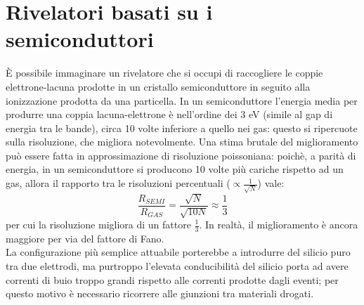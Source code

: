 \section{Rivelatori basati su i semiconduttori}
\`E possibile immaginare un rivelatore che si occupi di raccogliere le coppie elettrone-lacuna prodotte in un cristallo semiconduttore in seguito
alla ionizzazione prodotta da una particella.
In un semiconduttore l'energia media per produrre una coppia lacuna-elettrone \`e nell'ordine dei 3 eV (simile al gap di energia tra le bande),
circa 10 volte inferiore a quello nei gas: questo si ripercuote sulla risoluzione, che migliora notevolmente.
Una stima brutale del miglioramento pu\`o essere fatta in approssimazione di risoluzione poissoniana:
poich\`e, a parit\`a di energia, in un semiconduttore si producono 10 volte pi\`u cariche rispetto ad un gas, allora il rapporto tra le risoluzioni
percentuali ($\propto \frac{1}{\sqrt{N}}$) vale:
\begin{equation*}
\frac{R_{SEMI}}{R_{GAS}} = \frac{\sqrt{N}}{\sqrt{10 N}} \approx \frac{1}{3}
\end{equation*}
per cui la risoluzione migliora di un fattore $\frac{1}{3}$. 
In realt\`a, il miglioramento \`e ancora maggiore per via del fattore di Fano.\\
La configurazione pi\`u semplice attuabile porterebbe a introdurre del silicio puro tra due elettrodi, ma purtroppo l'elevata conducibilit\`a
del silicio porta ad avere correnti di buio troppo grandi rispetto alle correnti prodotte dagli eventi;
per questo motivo \`e necessario ricorrere alle giunzioni tra materiali drogati.
